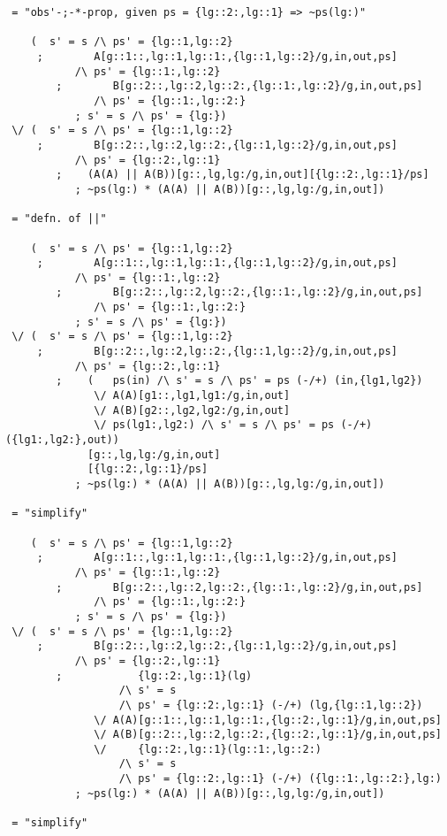 \begin{verbatim}
 = "obs'-;-*-prop, given ps = {lg::2:,lg::1} => ~ps(lg:)"

    (  s' = s /\ ps' = {lg::1,lg::2}
     ;        A[g::1::,lg::1,lg::1:,{lg::1,lg::2}/g,in,out,ps]
           /\ ps' = {lg::1:,lg::2}
        ;        B[g::2::,lg::2,lg::2:,{lg::1:,lg::2}/g,in,out,ps]
              /\ ps' = {lg::1:,lg::2:}
           ; s' = s /\ ps' = {lg:})
 \/ (  s' = s /\ ps' = {lg::1,lg::2}
     ;        B[g::2::,lg::2,lg::2:,{lg::1,lg::2}/g,in,out,ps]
           /\ ps' = {lg::2:,lg::1}
        ;    (A(A) || A(B))[g::,lg,lg:/g,in,out][{lg::2:,lg::1}/ps]
           ; ~ps(lg:) * (A(A) || A(B))[g::,lg,lg:/g,in,out])

 = "defn. of ||"

    (  s' = s /\ ps' = {lg::1,lg::2}
     ;        A[g::1::,lg::1,lg::1:,{lg::1,lg::2}/g,in,out,ps]
           /\ ps' = {lg::1:,lg::2}
        ;        B[g::2::,lg::2,lg::2:,{lg::1:,lg::2}/g,in,out,ps]
              /\ ps' = {lg::1:,lg::2:}
           ; s' = s /\ ps' = {lg:})
 \/ (  s' = s /\ ps' = {lg::1,lg::2}
     ;        B[g::2::,lg::2,lg::2:,{lg::1,lg::2}/g,in,out,ps]
           /\ ps' = {lg::2:,lg::1}
        ;    (   ps(in) /\ s' = s /\ ps' = ps (-/+) (in,{lg1,lg2})
              \/ A(A)[g1::,lg1,lg1:/g,in,out]
              \/ A(B)[g2::,lg2,lg2:/g,in,out]
              \/ ps(lg1:,lg2:) /\ s' = s /\ ps' = ps (-/+) ({lg1:,lg2:},out))
             [g::,lg,lg:/g,in,out]
             [{lg::2:,lg::1}/ps]
           ; ~ps(lg:) * (A(A) || A(B))[g::,lg,lg:/g,in,out])

 = "simplify"

    (  s' = s /\ ps' = {lg::1,lg::2}
     ;        A[g::1::,lg::1,lg::1:,{lg::1,lg::2}/g,in,out,ps]
           /\ ps' = {lg::1:,lg::2}
        ;        B[g::2::,lg::2,lg::2:,{lg::1:,lg::2}/g,in,out,ps]
              /\ ps' = {lg::1:,lg::2:}
           ; s' = s /\ ps' = {lg:})
 \/ (  s' = s /\ ps' = {lg::1,lg::2}
     ;        B[g::2::,lg::2,lg::2:,{lg::1,lg::2}/g,in,out,ps]
           /\ ps' = {lg::2:,lg::1}
        ;            {lg::2:,lg::1}(lg)
                  /\ s' = s
                  /\ ps' = {lg::2:,lg::1} (-/+) (lg,{lg::1,lg::2})
              \/ A(A)[g::1::,lg::1,lg::1:,{lg::2:,lg::1}/g,in,out,ps]
              \/ A(B)[g::2::,lg::2,lg::2:,{lg::2:,lg::1}/g,in,out,ps]
              \/     {lg::2:,lg::1}(lg::1:,lg::2:)
                  /\ s' = s
                  /\ ps' = {lg::2:,lg::1} (-/+) ({lg::1:,lg::2:},lg:)
           ; ~ps(lg:) * (A(A) || A(B))[g::,lg,lg:/g,in,out])

 = "simplify"


\end{verbatim}
